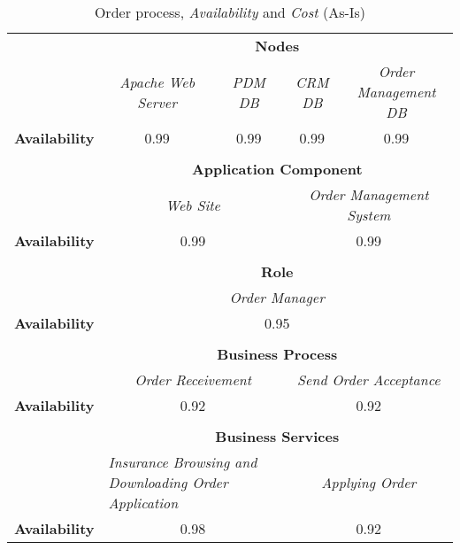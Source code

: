 \begin{table}[H]
	\centering
	\begin{tabular}{|c|c|p{2cm}|p{2.5cm}|p{2.5cm}|p{2.5cm}|}
		\cline{3-6}

		\multicolumn{2}{c}{} & \multicolumn{4}{|c|}{\textbf{Nodes}} \\ \cline{3-6}
		\multicolumn{2}{c|}{} & \multicolumn{1}{c|}{\textsl{Apache Web Server}} & \multicolumn{1}{c|}{\textsl{PDM DB}} & \multicolumn{1}{c|}{\textsl{CRM DB}} & \multicolumn{1}{c|}{\textsl{Order Management DB}} \\
		\hline
		\multicolumn{2}{|c|}{\textbf{Availability}}  & \multicolumn{1}{c|}{0.99} & \multicolumn{1}{c|}{0.99} & \multicolumn{1}{c|}{0.99} & \multicolumn{1}{c|}{0.99} \\ \hline
		
		\multicolumn{6}{c}{} \\ \cline{3-6}
		\multicolumn{2}{c}{} & \multicolumn{4}{|c|}{\textbf{Application Component}} \\ \cline{3-6}
		\multicolumn{2}{c|}{} & \multicolumn{2}{c|}{\textsl{Web Site}} & \multicolumn{2}{c|}{\textsl{Order Management System}} \\
		\hline
		\multicolumn{2}{|c|}{\textbf{Availability}} & \multicolumn{2}{c|}{0.99} & \multicolumn{2}{c|}{0.99}  \\ \hline
		
		\multicolumn{6}{c}{} \\ \cline{3-6}
		\multicolumn{2}{c}{} & \multicolumn{4}{|c|}{\textbf{Role}} \\ \cline{3-6}
		\multicolumn{2}{c|}{} & \multicolumn{4}{c|}{\textsl{Order Manager}} \\
		\hline
		\multicolumn{2}{|c|}{\textbf{Availability}}  & \multicolumn{4}{c|}{0.95}  \\ \hline

		\multicolumn{6}{c}{} \\ \cline{3-6}
		\multicolumn{2}{c}{} & \multicolumn{4}{|c|}{\textbf{Business Process}} \\ \cline{3-6}
		\multicolumn{2}{c|}{} & \multicolumn{2}{c|}{\textsl{Order Receivement}} & \multicolumn{2}{c|}{\textsl{Send Order Acceptance}} \\
		\hline
		\multicolumn{2}{|c|}{\textbf{Availability}} & \multicolumn{2}{c|}{0.92} & \multicolumn{2}{c|}{0.92} \\ \hline

		\multicolumn{6}{c}{} \\ \cline{3-6}
		\multicolumn{2}{c}{} & \multicolumn{4}{|c|}{\textbf{Business Services}} \\ \cline{3-6}
		\multicolumn{2}{c|}{} & \multicolumn{2}{p{5cm}|}{\textsl{Insurance Browsing and Downloading Order Application}} & \multicolumn{2}{c|}{\textsl{Applying Order}}  \\
		\hline
		\multicolumn{2}{|c|}{\textbf{Availability}}  & \multicolumn{2}{c|}{0.98} & \multicolumn{2}{c|}{0.92}\\ \hline
	\end{tabular}
\caption{Order process, \textsl{Availability} and \textsl{Cost} (As-Is)} 
\label{tab:order_as_is}
\end{table}